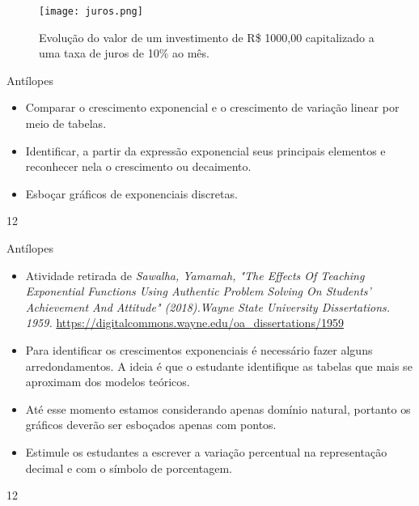 \begin{figure}[H]
\centering
\texttt{[image: juros.png]}
\caption{Evolução do valor de um investimento de R\$ 1000,00 capitalizado a uma taxa de juros de 10\% ao mês.}
\end{figure}

\needspace{.2\textheight}

\def\currentcolor{session2}
\begin{objectives}{Antílopes}
{
\begin{itemize}
\item Comparar o crescimento exponencial e o crescimento de variação linear por meio de tabelas.
\end{itemize}


\begin{itemize}
\item Identificar, a partir da expressão exponencial seus principais elementos e reconhecer nela o crescimento ou decaimento.

\item Esboçar gráficos de exponenciais discretas.
\end{itemize}

}{1}{2}
\end{objectives}
\begin{sugestions}{Antílopes}
{
\begin{itemize}
\item Atividade retirada de \textit{Sawalha, Yamamah, "The Effects Of Teaching Exponential Functions Using Authentic Problem Solving On Students’ Achievement
And Attitude" (2018).Wayne State University Dissertations. 1959.}
\url{https://digitalcommons.wayne.edu/oa_dissertations/1959}

\item Para identificar os crescimentos exponenciais é necessário fazer alguns arredondamentos. A ideia é que o estudante identifique as tabelas que mais se aproximam dos modelos teóricos.
\end{itemize}

\begin{itemize}
\item Até esse momento estamos considerando apenas domínio natural, portanto os gráficos deverão ser esboçados apenas com pontos.

\item Estimule os estudantes a escrever a variação percentual na representação decimal e com o símbolo de porcentagem.

\end{itemize}

}{1}{2}
\end{sugestions}
